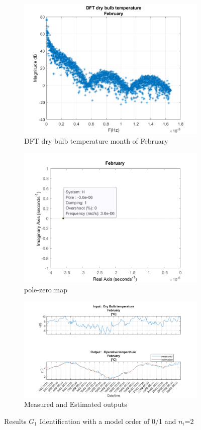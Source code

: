 \documentclass[a4paper,12pt]{article}
\numberwithin{equation}{section}
\begin{document}
\begin{figure}[H]
\centering
\begin{subfigure}{.5\textwidth}
  \centering
  \includegraphics[width=.7\linewidth]{Dft_drybulbFeb.png}
  \caption{DFT dry bulb temperature month of February}
  \label{fig:DFT G2mod0/1}
\end{subfigure}%
\begin{subfigure}{.5\textwidth}
  \centering
  \includegraphics[width=.7\linewidth]{G2mod01pzmap.png}
  \caption{pole-zero map}
  \label{fig:pzmap G2mod0/1}
\end{subfigure}

\begin{subfigure}{\textwidth}
  \centering
  \includegraphics[scale=0.38]{G2mod01InOut.png}
  \caption{Measured and Estimated outputs}
  \label{fig:inoutG20/1}
\end{subfigure}
\caption{Results $G_{1}$ Identification with a model order of 0/1 and $n_{i}$=2}
\label{fig:G2mod0/1}
\end{figure}
\end{document}
